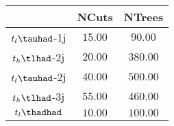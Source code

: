 \centering
\begin{tabular}{|c|c|c|} \hline
 & NCuts & NTrees\\\hline
$t_{l}\tauhad$-1j & $15.00$ & $90.00$\\\hline
$t_{h}\tlhad$-2j & $20.00$ & $380.00$\\\hline
$t_{l}\tauhad$-2j & $40.00$ & $500.00$\\\hline
$t_{h}\tlhad$-3j & $55.00$ & $460.00$\\\hline
$t_{l}\thadhad$ & $10.00$ & $100.00$\\\hline
\end{tabular}
